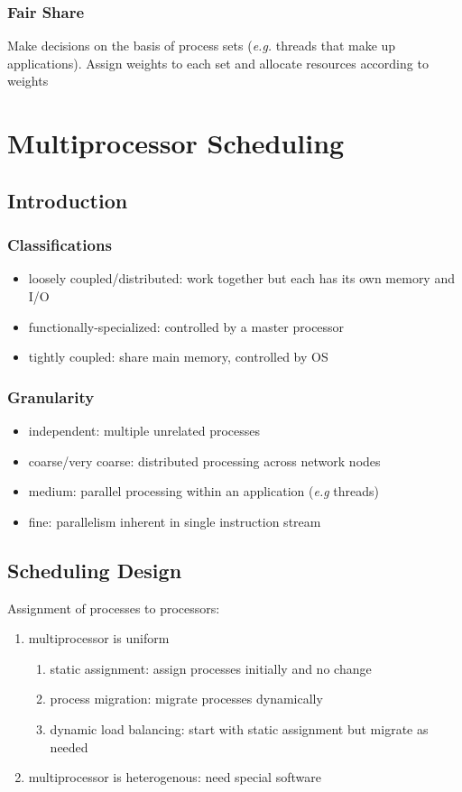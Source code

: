 \documentclass[]{article}
\theoremstyle{definition}
\begin{document}
	\subsubsection{Fair Share}
	Make decisions on the basis of process sets (\textit{e.g.} threads that make up applications).
	Assign weights to each set and allocate resources according to weights

	\section{Multiprocessor Scheduling}
	
	\subsection{Introduction}
	\subsubsection{Classifications}
	\begin{itemize}
		\item loosely coupled/distributed: work together but each has its own memory and I/O
		\item functionally-specialized: controlled by a master processor
		\item tightly coupled: share main memory, controlled by OS
	\end{itemize}

	\subsubsection{Granularity}
	\begin{itemize}
		\item independent: multiple unrelated processes
		\item coarse/very coarse: distributed processing across network nodes
		\item medium: parallel processing within an application (\textit{e.g} threads)
		\item fine: parallelism inherent in single instruction stream
	\end{itemize}

	
	\subsection{Scheduling Design}
	Assignment of processes to processors:
	\begin{enumerate}
		\item multiprocessor is uniform
			\begin{enumerate}
				\item static assignment: assign processes initially and no change
				\item process migration: migrate processes dynamically
				\item dynamic load balancing: start with static assignment but migrate as needed
			\end{enumerate}
		\item multiprocessor is heterogenous: need special software
	\end{enumerate}
\end{document}
